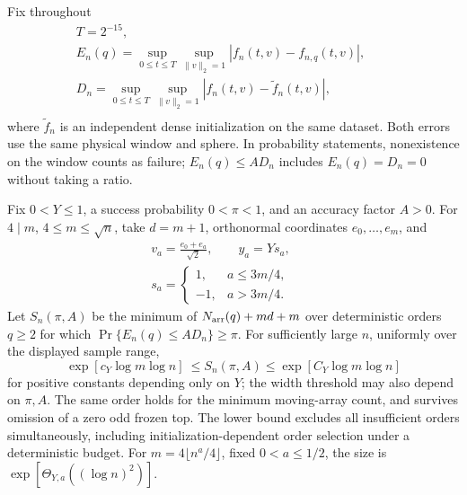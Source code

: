 Fix throughout
\begin{equation}\label{cp:nth:eq:errors}{\begin{gathered}
T=2^{-15},\qquad\\
E_n(q)=\sup_{0\le t\le T}\sup_{\|v\|_2=1}|f_n(t,v)-f_{n,q}(t,v)|,\qquad\\
D_n=\sup_{0\le t\le T}\sup_{\|v\|_2=1}|f_n(t,v)-\widetilde f_n(t,v)|,\\
\end{gathered}}\end{equation} where \(\widetilde f_n\) is an independent
dense initialization on the same dataset. Both errors use the same
physical window and sphere. In probability statements, nonexistence on
the window counts as failure; \(E_n(q)\le A D_n\) includes
\(E_n(q)=D_n=0\) without taking a ratio.

\begin{theorem}\label{cp:nth:matching}

Fix \(0<Y\le1\), a success probability \(0<\pi<1\), and an accuracy factor
\(A>0\). For \(4\mid m\), \(4\le m\le\sqrt n\), take \(d=m+1\),
orthonormal coordinates \(e_0,\ldots,e_m\), and
\begin{equation}\label{cp:nth:eq:hard-data}{\begin{gathered}
v_a=\frac{e_0+e_a}{\sqrt2},\qquad
y_a=Ys_a,\qquad\\
s_a=\begin{cases}1,&a\le3m/4,\\-1,&a>3m/4.\end{cases}
\end{gathered}}\end{equation} Let \(S_n(\pi,A)\) be the minimum of
\(N_{\rm arr}(q)+md+m\) over deterministic orders \(q\ge2\) for which
\(\Pr\{E_n(q)\le A D_n\}\ge\pi\). For sufficiently large \(n\), uniformly
over the displayed sample range,
\begin{equation}\label{cp:nth:eq:matched}{
\exp[c_Y\log m\log n]\ \le S_n(\pi,A)
\le\exp[C_Y\log m\log n]
}\end{equation} for positive constants depending only on \(Y\); the
width threshold may also depend on \(\pi,A\). The same order holds for the
minimum moving-array count, and survives omission of a zero odd frozen
top. The lower bound excludes all insufficient orders simultaneously,
including initialization-dependent order selection under a deterministic
budget. For \(m=4\lfloor n^a/4\rfloor\), fixed \(0<a\le1/2\), the size
is \(\exp[\Theta_{Y,a}((\log n)^2)]\).

\end{theorem}

